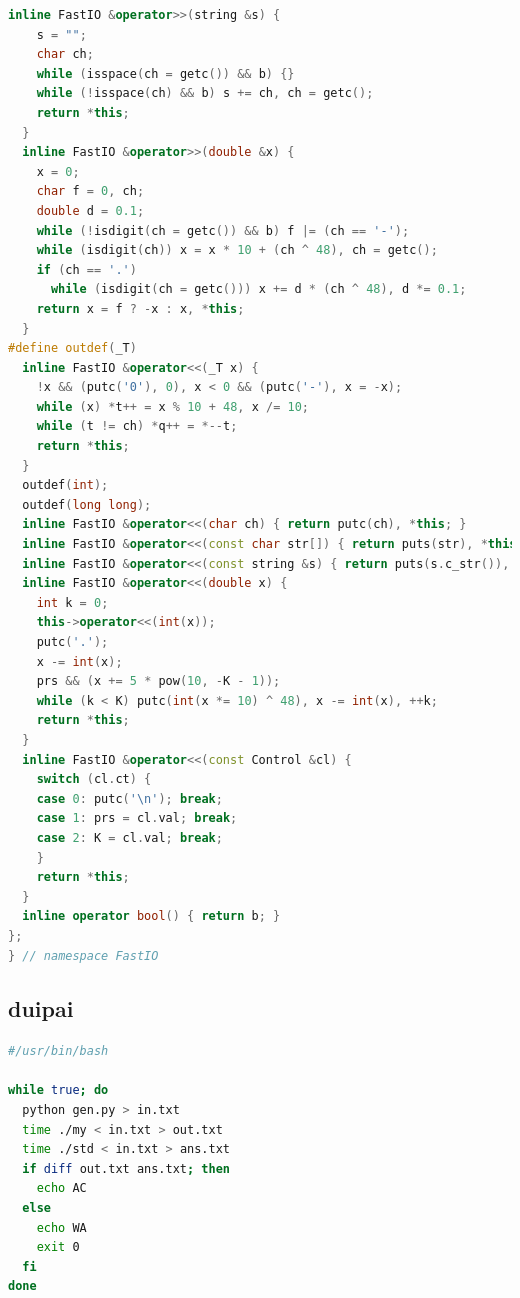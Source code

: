 \documentclass[twoside]{article}
\begin{document}
\begin{lstlisting}[language=c++]
  inline FastIO &operator>>(string &s) {
    s = "";
    char ch;
    while (isspace(ch = getc()) && b) {}
    while (!isspace(ch) && b) s += ch, ch = getc();
    return *this;
  }
  inline FastIO &operator>>(double &x) {
    x = 0;
    char f = 0, ch;
    double d = 0.1;
    while (!isdigit(ch = getc()) && b) f |= (ch == '-');
    while (isdigit(ch)) x = x * 10 + (ch ^ 48), ch = getc();
    if (ch == '.')
      while (isdigit(ch = getc())) x += d * (ch ^ 48), d *= 0.1;
    return x = f ? -x : x, *this;
  }
#define outdef(_T)                                                             \
  inline FastIO &operator<<(_T x) {                                            \
    !x && (putc('0'), 0), x < 0 && (putc('-'), x = -x);                        \
    while (x) *t++ = x % 10 + 48, x /= 10;                                     \
    while (t != ch) *q++ = *--t;                                               \
    return *this;                                                              \
  }
  outdef(int);
  outdef(long long);
  inline FastIO &operator<<(char ch) { return putc(ch), *this; }
  inline FastIO &operator<<(const char str[]) { return puts(str), *this; }
  inline FastIO &operator<<(const string &s) { return puts(s.c_str()), *this; }
  inline FastIO &operator<<(double x) {
    int k = 0;
    this->operator<<(int(x));
    putc('.');
    x -= int(x);
    prs && (x += 5 * pow(10, -K - 1));
    while (k < K) putc(int(x *= 10) ^ 48), x -= int(x), ++k;
    return *this;
  }
  inline FastIO &operator<<(const Control &cl) {
    switch (cl.ct) {
    case 0: putc('\n'); break;
    case 1: prs = cl.val; break;
    case 2: K = cl.val; break;
    }
    return *this;
  }
  inline operator bool() { return b; }
};
} // namespace FastIO

\end{lstlisting}
\subsection{duipai}
\begin{lstlisting}[language=bash]
#/usr/bin/bash

while true; do
  python gen.py > in.txt
  time ./my < in.txt > out.txt
  time ./std < in.txt > ans.txt
  if diff out.txt ans.txt; then
    echo AC
  else
    echo WA
    exit 0
  fi
done

\end{lstlisting}
\end{document}
